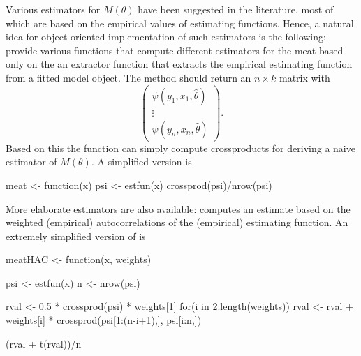 \documentclass{Z}
\begin{document}
Various estimators for $M(\theta)$ have been suggested in the literature, most of which
are based on the empirical values of estimating functions. Hence, a natural idea
for object-oriented implementation of such estimators is the following: provide various 
functions that compute different estimators for the meat based only on the an
 extractor function that extracts the empirical estimating function
from a fitted model object. The  method should return
an $n \times k$ matrix with
 \[ \left( \begin{array}{c} \psi(y_1, x_1, \hat \theta) \\ \vdots \\ \psi(y_n, x_n, \hat \theta)
    \end{array} \right). \]
Based on this the function  can simply compute crossproducts for deriving a naive
estimator of $M(\theta)$. A simplified version is
\begin{Schunk}
\begin{Sinput}
meat <- function(x)
{
  psi <- estfun(x)
  crossprod(psi)/nrow(psi)
}
\end{Sinput}
\end{Schunk}

More elaborate estimators are also available:  computes an estimate based on the
weighted (empirical) autocorrelations of the (empirical) estimating function. An extremely simplified
version of  is
\begin{Schunk}
\begin{Sinput}
meatHAC <- function(x, weights)
{
  psi <- estfun(x)
  n <- nrow(psi)

  rval <- 0.5 * crossprod(psi) * weights[1]
  for(i in 2:length(weights))
    rval <- rval + weights[i] * crossprod(psi[1:(n-i+1),], psi[i:n,])
  
  (rval + t(rval))/n
}
\end{Sinput}
\end{Schunk}
\end{document}
